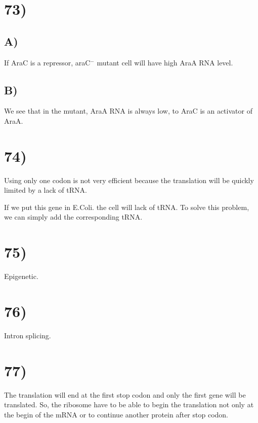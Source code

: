 \section*{73)}
\subsection*{A)} If AraC is a repressor, araC$^-$ mutant cell will have high AraA RNA level.

\subsection*{B)} We see that in the mutant, AraA RNA is always low, to AraC is an activator of AraA.

\section*{74)}
Using only one codon is not very efficient because the translation will be quickly limited by a lack of tRNA.

If we put this gene in E.Coli. the cell will lack of tRNA. To solve this problem, we can simply add the corresponding tRNA.

\section*{75)}
Epigenetic.

\section*{76)}
Intron splicing.

\section*{77)}
The translation will end at the first stop codon and only the first gene will be translated. So, the ribosome have to be able to begin the translation not only at the begin of the mRNA or to continue another protein after stop codon.


